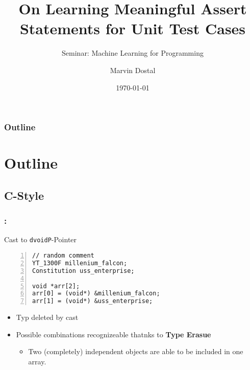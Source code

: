 \documentclass{beamer}
\title{On Learning Meaningful Assert Statements for Unit Test Cases}
\subtitle{Seminar: Machine Learning for Programming}
\author{Marvin Dostal}
\institute{Student at the University of Stuttgart}
\date{\today}
\begin{document}
\frame{\titlepage}

\begin{frame}
    \frametitle{Outline}
    \tableofcontents[hideallsubsections]
    \clearpage

\end{frame}

\section{Outline}
\subsection{C-Style}

\begin{frame}[fragile] %
    \frametitle{\secname: \subsecname}

    \begin{block}{Cast to \texttt{dvoidP}-Pointer}
        \begin{lstlisting}[style=cpp, numbers=left]
// random comment
YT_1300F millenium_falcon;
Constitution uss_enterprise;

void *arr[2];
arr[0] = (void*) &millenium_falcon;
arr[1] = (void*) &uss_enterprise;
        \end{lstlisting}

        \begin{itemize}
            \item Typ deleted by cast
                \pause
            \item Possible combinations recognizeable thatnks to \textbf{Type Erasue}
                \begin{itemize}
                    \item Two (completely) independent objects are able to be included in one array.
                \end{itemize}
        \end{itemize}
    \end{block}


\end{frame} 
\end{document}

